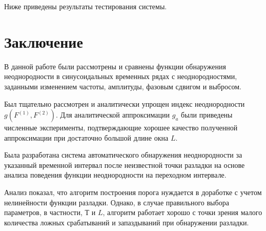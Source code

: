 \documentclass[specialist, substylefile = spbu.rtx,
			   subf, href, 12pt]{disser}
\begin{document}
Ниже приведены результаты тестирования системы.


\newpage
\chapter*{Заключение}

В данной работе были рассмотрены и сравнены функции обнаружения неоднородности в синусоидальных временных рядах с неоднородностями, заданными изменением частоты, амплитуды, фазовым сдвигом и выбросом. 

Был тщательно рассмотрен и аналитически упрощен индекс неоднородности \newline $ g(F^{(1)}, F^{(2)}) $. Для аналитической аппроксимации $ g_a $ были приведены численные эксперименты, подтверждающие хорошее качество полученной аппроксимации при достаточно большой длине окна $L$.

Была разработана система автоматического обнаружения неоднородности за указанный временной интервал после неизвестной точки разладки на основе анализа поведения функции неоднородности на переходном интервале.

Анализ показал, что алгоритм построения порога нуждается в доработке с учетом нелинейности функции разладки. Однако, в случае правильного выбора параметров, в частности, $ Т $ и $ L $, алгоритм работает хорошо с точки зрения малого количества ложных срабатываний и запаздываний при обнаружении разладки.




\end{document}
